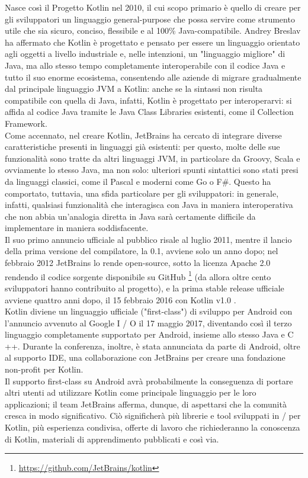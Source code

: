 Nasce così il Progetto Kotlin nel 2010, il cui scopo primario è quello di creare per gli sviluppatori un linguaggio general-purpose che possa servire come strumento utile che sia sicuro, conciso, flessibile e al 100\% Java-compatibile. Andrey Breslav ha affermato che Kotlin è progettato e pensato per essere un linguaggio orientato agli oggetti a livello industriale e, nelle intenzioni, un "linguaggio migliore" \cite{kotlinOracle} di Java, ma allo stesso tempo completamente interoperabile con il codice Java e tutto il suo enorme ecosistema, consentendo alle aziende di migrare gradualmente dal principale linguaggio JVM a Kotlin: anche se la sintassi non risulta compatibile con quella di Java, infatti, Kotlin è progettato per interoperarvi: si affida al codice Java tramite le Java Class Libraries esistenti, come il Collection Framework. \\

Come accennato, nel creare Kotlin, JetBrains ha cercato di integrare diverse caratteristiche presenti in linguaggi già esistenti: per questo, molte delle sue funzionalità sono tratte da altri linguaggi JVM, in particolare da Groovy, Scala e ovviamente lo stesso Java, ma non solo: ulteriori spunti sintattici sono stati presi da linguaggi classici, come il Pascal e moderni come Go o F\#. Questo ha comportato, tuttavia, una sfida particolare per gli sviluppatori: in generale, infatti, qualsiasi funzionalità che interagisca con Java in maniera interoperativa che non abbia un'analogia diretta in Java sarà certamente difficile da implementare in maniera soddisfacente.\\

Il suo primo annuncio ufficiale al pubblico risale al luglio 2011, mentre il lancio della prima versione del compilatore, la 0.1, avviene solo un anno dopo; nel febbraio 2012 JetBrains lo rende open-source, sotto la licenza Apache 2.0 rendendo il codice sorgente disponibile su GitHub \footnote{\url{https://github.com/JetBrains/kotlin}} (da allora oltre cento sviluppatori hanno contribuito al progetto), e la prima stable release ufficiale avviene quattro anni dopo, il 15 febbraio 2016 con Kotlin v1.0 \cite{kotlinv1.0}.\\
Kotlin diviene un linguaggio ufficiale ("first-class") di sviluppo per Android con l'annuncio \cite{kotlinOfficialAndroid} avvenuto al Google I / O \cite{googleio} il 17 maggio 2017, diventando così il terzo linguaggio completamente supportato per Android, insieme allo stesso Java e C ++. Durante la conferenza, inoltre, è stata annunciata da parte di Android, oltre al supporto IDE, una collaborazione con JetBrains per creare una fondazione non-profit per Kotlin. \\
Il supporto first-class su Android avrà probabilmente la conseguenza di portare altri utenti ad utilizzare Kotlin come principale linguaggio per le loro applicazioni; il team JetBrains afferma, dunque, di aspettarsi che la comunità cresca in modo significativo. Ciò significherà più librerie e tool sviluppati in / per Kotlin, più esperienza condivisa, offerte di lavoro che richiederanno la conoscenza di Kotlin, materiali di apprendimento pubblicati e così via.\\

